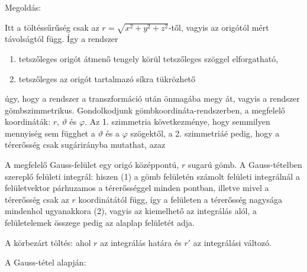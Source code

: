 
\ifdefined\megoldas
   

 Megoldás: 

 Itt a töltéssűrűség csak az $r=\sqrt{x^2+y^2+z^2}$-től, vagyis az origótól mért távolságtól függ. Így a rendszer 
 \begin{enumerate}[itemsep=0pt]
  \item tetszőleges origót átmenő tengely körül tetszőleges szöggel elforgatható,
  \item tetszőleges az origót tartalmazó síkra tükrözhető
 \end{enumerate}
 úgy, hogy a rendszer a transzformáció után önmagába megy át, vagyis a rendszer gömbszimmetrikus. Gondolkodjunk gömbkoordináta-rendszerben, a megfelelő koordináták: $r$, $\vartheta$ és $\varphi$. Az 1. szimmetria következménye, hogy semmilyen mennyiség sem függhet a $\vartheta$ és a $\varphi$ szögektől, a 2. szimmetriáé pedig, hogy a térerősség csak sugárirányba mutathat, azaz

 A megfelelő Gauss-felület egy origó középpontú, $r$ sugarú gömb. A Gauss-tételben szereplő felületi integrál:
 hiszen (1) a gömb felületén számolt felületi integrálnál a felületvektor párhuzamos a térerősséggel minden pontban, illetve mivel a térerősség csak az $r$ koordinátától függ, így a felületen a térerősség nagysága mindenhol ugyanakkora (2), vagyis az kiemelhető az integrálás alól, a felületelemek összege pedig az alaplap felületét adja.

 A körbezárt töltés:
 ahol $r$ az integrálás határa és $r'$ az integrálási változó.

 A Gauss-tétel alapján:

 \fi